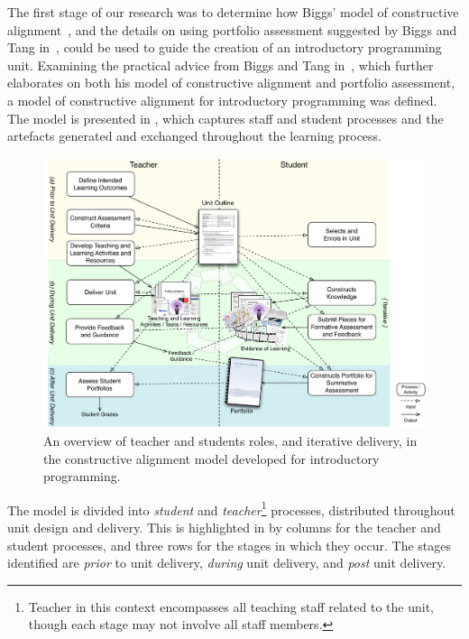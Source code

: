 
The first stage of our research was to determine how Biggs' model of constructive alignment~\cite{Biggs:1996c}, and the details on using portfolio assessment suggested by Biggs and Tang in~\cite{Biggs:1997}, could be used to guide the creation of an introductory programming unit. Examining the practical advice from Biggs and Tang in~\cite{Biggs:2007}, which further elaborates on both his model of constructive alignment and portfolio assessment, a model of constructive alignment for introductory programming was defined. The model is presented in , which captures staff and student processes and the artefacts generated and exchanged throughout the learning process.

\begin{figure}[t!]
	\centering
	\includegraphics[width=6in]{ProcessOverview}
	\caption{An overview of teacher and students roles, and iterative delivery, in the constructive alignment model developed for introductory programming.}
	\label{fig:process_overview}
\end{figure}

The model is divided into \emph{student} and \emph{teacher}\footnote{Teacher in this context encompasses all teaching staff related to the unit, though each stage may not involve all staff members.} processes, distributed throughout unit design and delivery. This is highlighted in  by columns for the teacher and student processes, and three rows for the stages in which they occur. The stages identified are \emph{prior} to unit delivery, \emph{during} unit delivery, and \emph{post} unit delivery.

